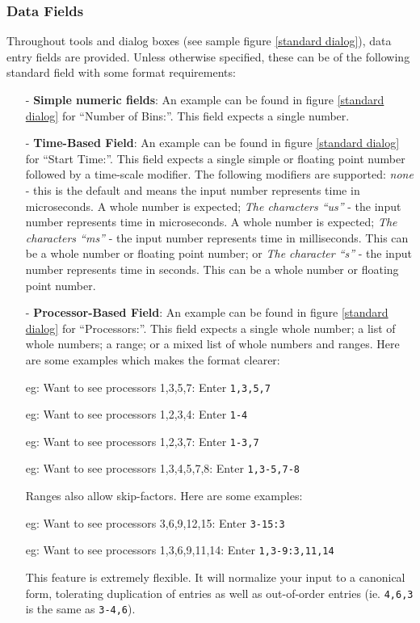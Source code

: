 \documentclass[10pt]{article}
\begin{document}
\subsubsection{Data Fields}

Throughout \projections{} tools and dialog boxes (see sample figure
\ref{standard dialog}), data entry fields are provided. Unless
otherwise specified, these can be of the following standard field with
some format requirements:

\begin{itemize}
\item[-] {\bf Simple numeric fields}: An example can be found in
figure \ref{standard dialog} for ``Number of Bins:''. This field expects
a single number.
\item[-] {\bf Time-Based Field}: An example can be found in figure
\ref{standard dialog} for ``Start Time:''. This field expects a single
simple or floating point number followed by a time-scale modifier. The
following modifiers are supported: {\it none} - this is the default
and means the input number represents time in microseconds. A whole
number is expected; {\it The characters ``us''} - the input number
represents time in microseconds. A whole number is expected; {\it The
characters ``ms''} - the input number represents time in
milliseconds. This can be a whole number or floating point number; or
{\it The character ``s''} - the input number represents time in
seconds. This can be a whole number or floating point number.
\item[-] {\bf Processor-Based Field}: An example can be found in
figure \ref{standard dialog} for ``Processors:''. This field expects a
single whole number; a list of whole numbers; a range; or a mixed list
of whole numbers and ranges. Here are some examples which makes the
format clearer:

   eg: Want to see processors 1,3,5,7:  Enter {\tt 1,3,5,7}

   eg: Want to see processors 1,2,3,4:  Enter {\tt 1-4}

   eg: Want to see processors 1,2,3,7:  Enter {\tt 1-3,7}

   eg: Want to see processors 1,3,4,5,7,8: Enter {\tt 1,3-5,7-8}

Ranges also allow skip-factors. Here are some examples:

   eg: Want to see processors 3,6,9,12,15: Enter {\tt 3-15:3}

   eg: Want to see processors 1,3,6,9,11,14: Enter {\tt 1,3-9:3,11,14}

This feature is extremely flexible. It will normalize your input to a
canonical form, tolerating duplication of entries as well as
out-of-order entries (ie. {\tt 4,6,3} is the same as {\tt 3-4,6}).
\end{itemize}
\end{document}
